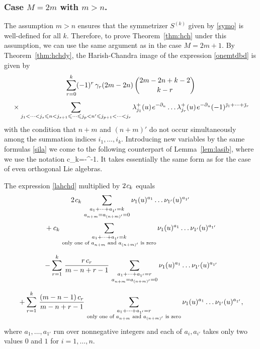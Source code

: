 \documentclass[12pt]{article}
\begin{document}
\subsubsection*{Case $M=2m$ with $m>n$.}

The assumption $m>n$ ensures that the symmetrizer $S^{(k)}$
given by \eqref{symo}
is well-defined for all $k$. Therefore, to prove
Theorem~\ref{thm:hch} under this assumption,
we can use the same argument as in the case $M=2m+1$.
By Theorem~\ref{thm:hchdy}, the Harish-Chandra image of the
expression \eqref{onemtdbd} is given by
\begin{multline}
\label{lahchd}
\sum_{r=0}^k(-1)^{r}\,\gamma_r(2m-2n)\,\binom{2m-2n+k-2}{k-r}\\[0.4em]
{}\times\sum_{j_1<\dots<j_s\leqslant n<j_{s+1}\leqslant\dots\leqslant j_p<n'\leqslant j_{p+1}<\dots<j_r}
\lambda^+_{j_1}(u)\hspace{1pt} e^{-\partial_u}\dots \lambda^+_{j_r}(u)\hspace{1pt} e^{-\partial_u}(-1)^{\bar{\jmath}_1+\dots+\bar{\jmath}_r}
\end{multline}
with
the condition that $n+m$ and $(n+m)'$ do not occur
simultaneously
among the summation indices $i_1,\dots,i_k$.
Introducing new variables by the same formulas \eqref{sila}
we come to the following counterpart of Lemma~\ref{lem:lasib},
where we use the notation
\ben
c_k=-^{-1}.
\een
It takes essentially the same form as \cite[Lemma~13.1.11]{m:so} for the case
of even orthogonal Lie algebras.

\ble\label{lem:lasid}
The expression \eqref{lahchd} multiplied by $2\hspace{1pt} c_k$ equals
\begin{multline}
2\tss c_k\ts
\sum_{\underset{\scriptstyle a^{}_{n+m}=a_{(n+m)'}=0}{a_1+\dots+a_{1'}=k}}
\nu_{1}(u)^{a_1}\dots \nu_{1'}(u)^{a_{1'}}\\
{}+c_k\ts
\sum_{\underset{\scriptstyle \text{only one of\ } a^{}_{n+m}\text{\ and\ }a_{(n+m)'}
\text{\ is zero}}{a_1+\dots+a_{1'}=k}}
\nu_{1}(u)^{a_1}\dots \nu_{1'}(u)^{a_{1'}}\\[0.5em]
{}-\sum_{r=1}^k\ts\frac{r\ts c_r}{m-n+r-1}\ts
\sum_{\underset{\scriptstyle a^{}_{n+m}=a_{(n+m)'}=0}{a_1+\dots+a_{1'}=r}}
\nu_{1}(u)^{a_1}\dots \nu_{1'}(u)^{a_{1'}}\\[0.5em]
{}+\sum_{r=1}^k\ts\frac{(m-n-1)\ts c_r}{m-n+r-1}\ts
\sum_{\underset{\scriptstyle \text{only one of\ } a^{}_{n+m}\text{\ and\ }a_{(n+m)'}
\text{\ is zero}}{a_1+\dots+a_{1'}=r}}
\nu_{1}(u)^{a_1}\dots \nu_{1'}(u)^{a_{1'}},
\non
\end{multline}
where $a_1,\dots,a_{1'}$ run over nonnegative integers and
each of $a_i,a_{i'}$
takes only two values $0$ and $1$ for $i=1,\dots,n$.
\ele
\end{document}
